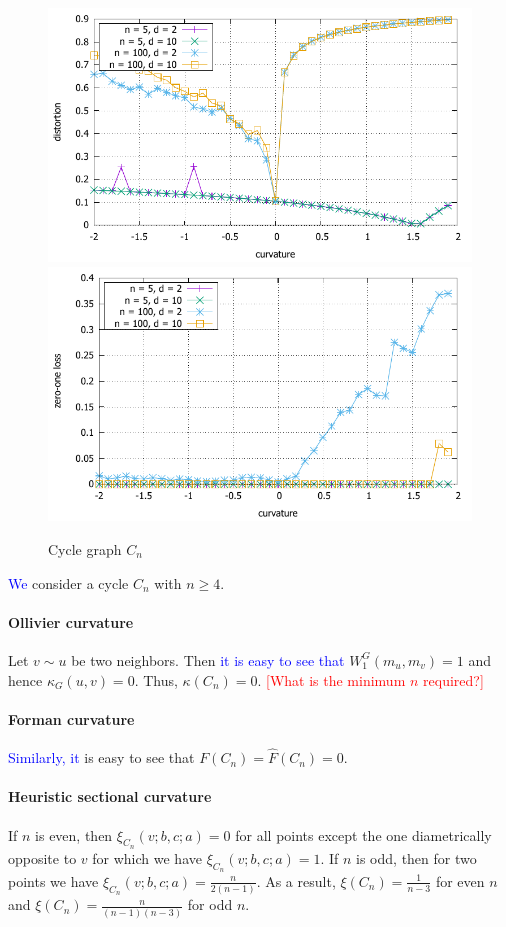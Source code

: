 \documentclass{article} %
\newcommand{\ph}[1]{\textcolor{blue}{#1}}
\begin{document}
\begin{figure}
    \centering
    \includegraphics[width = 0.49 \textwidth]{cycle_distortion.pdf}
    \includegraphics[width = 0.49 \textwidth]{cycle_zero_one.pdf}
    \caption{Cycle graph $C_{n}$}
    \label{fig:cycle}
\end{figure}

\ph{We} consider a cycle $C_n$ with $n \ge 4$.

\paragraph{Ollivier curvature}  
Let $v \sim u$ be two neighbors. Then \ph{it is easy to see that} $W_1^G(m_u,m_v) = 1$ and hence $\kappa_G(u,v) = 0$. Thus, $\kappa(C_n) = 0$. \textcolor{red}{[What is the minimum $n$ required?]}

\paragraph{Forman curvature} 

\ph{Similarly, it} is easy to see that $F(C_n) = \hat F(C_n) = 0$.


\paragraph{Heuristic sectional curvature} If $n$ is even, then $\xi_{C_n}(v;b,c;a) = 0$ for all points except the one diametrically opposite to $v$ for which we have $\xi_{C_n}(v;b,c;a) = 1$. If $n$ is odd, then for two points we have $\xi_{C_n}(v;b,c;a) = \frac{n}{2(n-1)}$. As a result, $\xi(C_n) = \frac{1}{n-3}$ for even $n$ and $\xi(C_n) = \frac{n}{(n-1)(n-3)}$ for odd $n$.
\end{document}
